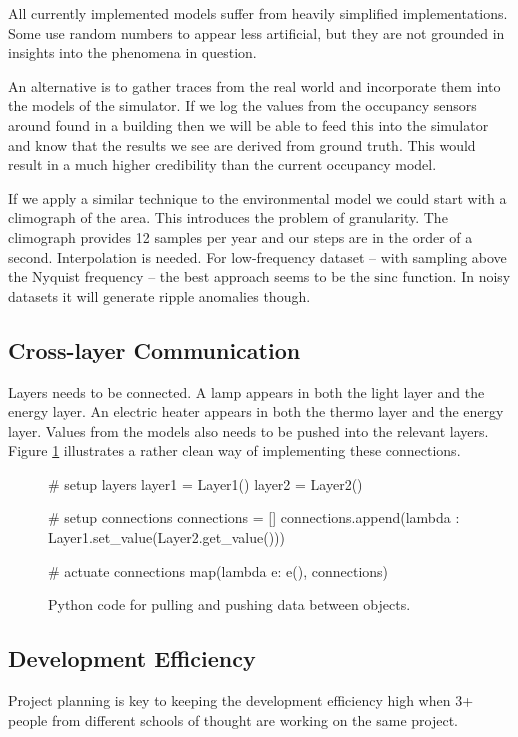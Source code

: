 \documentclass[10pt]{article}
\begin{document}
All currently implemented models suffer from heavily simplified implementations. Some use random numbers to appear less artificial, but they are not grounded in insights into the phenomena in question.

An alternative is to gather traces from the real world and incorporate them into the models of the simulator. If we log the values from the occupancy sensors around found in a building then we will be able to feed this into the simulator and know that the results we see are derived from ground truth. This would result in a much higher credibility than the current occupancy model.

If we apply a similar technique to the environmental model we could start with a climograph of the area. This introduces the problem of granularity. The climograph provides 12 samples per year and our steps are in the order of a second. Interpolation is needed. For low-frequency dataset -- with sampling above the Nyquist frequency -- the best approach seems to be the $\mathrm{sinc}$ function. In noisy datasets it will generate ripple anomalies though.

\subsection{Cross-layer Communication}

Layers needs to be connected. A lamp appears in both the light layer and the energy layer. An electric heater appears in both the thermo layer and the energy layer. Values from the models also needs to be pushed into the relevant layers. Figure \ref{fig:lessons:xlayer} illustrates a rather clean way of implementing these connections.

\begin{figure}[htb]
  \begin{center}
\begin{python}
# setup layers
layer1 = Layer1()
layer2 = Layer2()

# setup connections
connections = []
connections.append(lambda : Layer1.set_value(Layer2.get_value()))

# actuate connections
map(lambda e: e(), connections)
\end{python}
  \end{center}
  \caption{Python code for pulling and pushing data between objects.}
  \label{fig:lessons:xlayer}
\end{figure}

\subsection{Development Efficiency}

Project planning is key to keeping the development efficiency high when 3+ people from different schools of thought are working on the same project.
\end{document}
